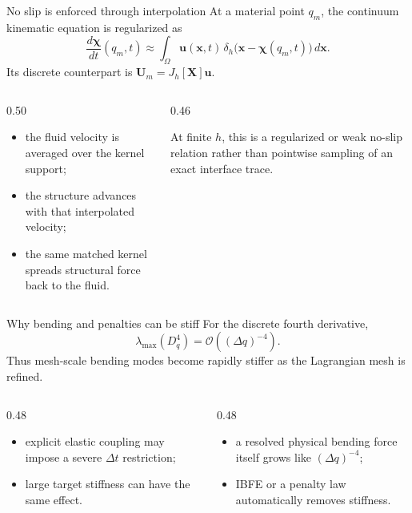 \documentclass[aspectratio=169,11pt]{beamer}
\newcommand{\uvec}{\bm{u}}
\newcommand{\xvec}{\bm{x}}
\newcommand{\Xvec}{\bm{X}}
\begin{document}
\begin{frame}{No slip is enforced through interpolation}
At a material point $q_m$, the continuum kinematic equation is regularized as
\[
 \frac{d\boldsymbol\chi}{dt}(q_m,t)
 \approx\int_\Omega \uvec(\xvec,t)\,
 \delta_h\bigl(\xvec-\boldsymbol\chi(q_m,t)\bigr)\,d\xvec.
\]
Its discrete counterpart is $\bm U_m=J_h[\Xvec]\uvec$.
\begin{columns}[T,onlytextwidth]
\begin{column}{0.50\textwidth}
\begin{itemize}\itemsep4pt
  \item the fluid velocity is averaged over the kernel support;
  \item the structure advances with that interpolated velocity;
  \item the same matched kernel spreads structural force back to the fluid.
\end{itemize}
\end{column}
\begin{column}{0.46\textwidth}
\begin{punchbox}
At finite $h$, this is a regularized or weak no-slip relation rather than pointwise sampling of an exact interface trace.
\end{punchbox}
\end{column}
\end{columns}
\end{frame}

\begin{frame}{Why bending and penalties can be stiff}
For the discrete fourth derivative,
\[
  \lambda_{\max}(D_q^4)=\mathcal{O}((\Delta q)^{-4}).
\]
Thus mesh-scale bending modes become rapidly stiffer as the Lagrangian mesh is refined.
\begin{columns}[T,onlytextwidth]
\begin{column}{0.48\textwidth}
\begin{itemize}\itemsep4pt
  \item explicit elastic coupling may impose a severe $\Delta t$ restriction;
  \item large target stiffness can have the same effect.
\end{itemize}
\end{column}
\begin{column}{0.48\textwidth}
\begin{itemize}\itemsep4pt
  \item a resolved physical bending force itself grows like $(\Delta q)^{-4}$;
  \item IBFE or a penalty law automatically removes stiffness.
\end{itemize}
\end{column}
\end{columns}
\end{frame}
\end{document}
